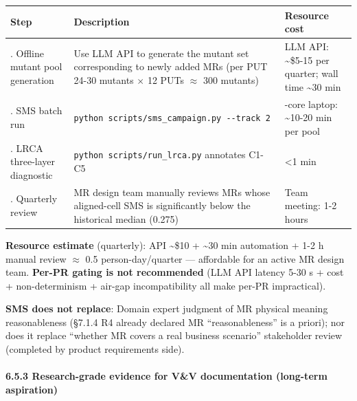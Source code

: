 \documentclass[review,12pt,authoryear]{elsarticle}
\begin{document}
{\def\LTcaptype{none} %
\begin{longtable}[]{@{}
  >{\raggedright\arraybackslash}p{}
  >{\raggedright\arraybackslash}p{}
  >{\raggedright\arraybackslash}p{}@{}}
\toprule\noalign{}
\begin{minipage}[b]{\linewidth}\raggedright
Step
\end{minipage} & \begin{minipage}[b]{\linewidth}\raggedright
Description
\end{minipage} & \begin{minipage}[b]{\linewidth}\raggedright
Resource cost
\end{minipage} \\
\midrule\noalign{}
\endhead
\bottomrule\noalign{}
\endlastfoot
1. Offline mutant pool generation & Use LLM API to generate the mutant
set corresponding to newly added MRs (per PUT 24-30 mutants $\times$ 12 PUTs $\approx$
300 mutants) & LLM API: \textasciitilde\$5-15 per quarter; wall time
\textasciitilde30 min \\
2. SMS batch run &
\texttt{python\ scripts/sms\_campaign.py\ -\/-track\ 2} & 4-core laptop:
\textasciitilde10-20 min per pool \\
3. LRCA three-layer diagnostic & \texttt{python\ scripts/run\_lrca.py}
annotates C1-C5 & \textless1 min \\
4. Quarterly review & MR design team manually reviews MRs whose
aligned-cell SMS is significantly below the historical median (0.275) &
Team meeting: 1-2 hours \\
\end{longtable}
}

\textbf{Resource estimate} (quarterly): API \textasciitilde\$10 +
\textasciitilde30 min automation + 1-2 h manual review $\approx$ 0.5
person-day/quarter --- affordable for an active MR design team.
\textbf{Per-PR gating is not recommended} (LLM API latency 5-30 s + cost
+ non-determinism + air-gap incompatibility all make per-PR
impractical).

\textbf{SMS does not replace}: Domain expert judgment of MR physical
meaning reasonableness (§7.1.4 R4 already declared MR ``reasonableness''
is a priori); nor does it replace ``whether MR covers a real business
scenario'' stakeholder review (completed by product requirements side).

\paragraph{6.5.3 Research-grade evidence for V\&V documentation
(long-term
aspiration)}\label{research-grade-evidence-for-vv-documentation-long-term-aspiration}
\end{document}
